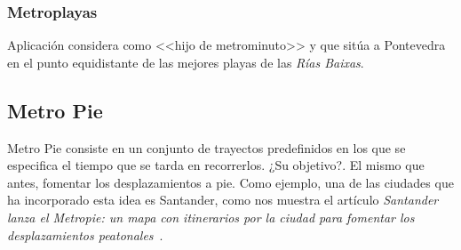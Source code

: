 \subsubsection{Metroplayas}
Aplicación considera como <<hijo de metrominuto>> y que sitúa a Pontevedra en el punto equidistante de las mejores playas de las \textit{Rías Baixas}.


\subsection{Metro Pie}
Metro Pie consiste en un conjunto de trayectos predefinidos en los que se especifica el tiempo que se tarda en recorrerlos. ¿Su objetivo?. El mismo que antes, fomentar los desplazamientos a pie. Como ejemplo, una de las ciudades que ha incorporado esta idea es Santander, como nos muestra el artículo \textit{Santander lanza el Metropie: un mapa con itinerarios por la ciudad para fomentar los desplazamientos peatonales}~\cite{art:metropie}.
